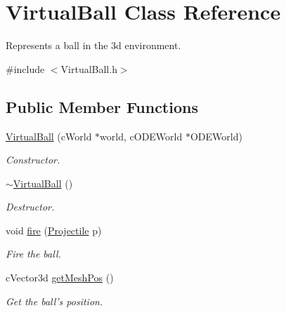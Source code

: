 \hypertarget{classVirtualBall}{
\section{VirtualBall Class Reference}
\label{classVirtualBall}
}


Represents a ball in the 3d environment.  




{\ttfamily \#include $<$VirtualBall.h$>$}

\subsection*{Public Member Functions}
\begin{DoxyCompactItemize}
\item 
\hyperlink{classVirtualBall_ac23e87ff7e9311a6eec9534cf7c4ad19}{VirtualBall} (cWorld $\ast$world, cODEWorld $\ast$ODEWorld)
\begin{DoxyCompactList}\small\item\em Constructor. \item\end{DoxyCompactList}\item 
\hypertarget{classVirtualBall_af8e24103797c63c53886dc82fcab09e8}{
\hyperlink{classVirtualBall_af8e24103797c63c53886dc82fcab09e8}{$\sim$VirtualBall} ()}
\label{classVirtualBall_af8e24103797c63c53886dc82fcab09e8}

\begin{DoxyCompactList}\small\item\em Destructor. \item\end{DoxyCompactList}\item 
void \hyperlink{classVirtualBall_a886d85950bb75ca63c2583e1a0ac9211}{fire} (\hyperlink{classProjectile}{Projectile} p)
\begin{DoxyCompactList}\small\item\em Fire the ball. \item\end{DoxyCompactList}\item 
cVector3d \hyperlink{classVirtualBall_a4477ee504d911d89d66dd1c61aa0fcb1}{getMeshPos} ()
\begin{DoxyCompactList}\small\item\em Get the ball's position. \item\end{DoxyCompactList}\end{DoxyCompactItemize}



